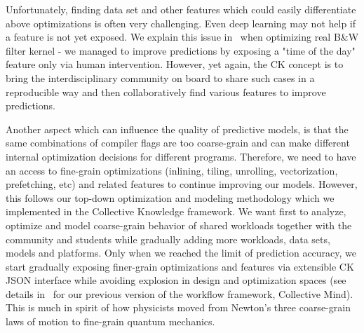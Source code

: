Unfortunately, finding data set and other features which could easily differentiate
above optimizations is often very challenging.
%
Even deep learning may not help if a feature is not yet exposed.
%
We explain this issue in~\cite{cm:29db2248aba45e59:cd11e3a188574d80}
when optimizing real B\&W filter kernel - we managed to improve
predictions by exposing a "time of the day" feature
only via human intervention.
%
However, yet again, the CK concept is to bring the interdisciplinary
community on board to share such cases in a reproducible way 
and then collaboratively find various features to improve predictions.

Another aspect which can influence the quality of predictive models,
is that the same combinations of compiler flags are too coarse-grain
and can make different internal optimization decisions 
for different programs.
%
Therefore, we need to have an access to fine-grain optimizations
(inlining, tiling, unrolling, vectorization, prefetching, etc)
and related features to continue improving our models.
%
However, this follows our top-down optimization and modeling methodology 
which we implemented in the Collective Knowledge framework.
%
We want first to analyze, optimize and model coarse-grain behavior of shared workloads
together with the community and students while gradually adding more workloads, 
data sets, models and platforms.
%
Only when we reached the limit of prediction accuracy, 
we start gradually exposing finer-grain optimizations 
and features via extensible CK JSON interface 
while avoiding explosion in design and optimization spaces
(see details in~\cite{fursin:hal-01054763} for our previous
version of the workflow framework, Collective Mind).
%
This is much in spirit of how physicists moved from Newton's 
three coarse-grain laws of motion to fine-grain quantum mechanics.

